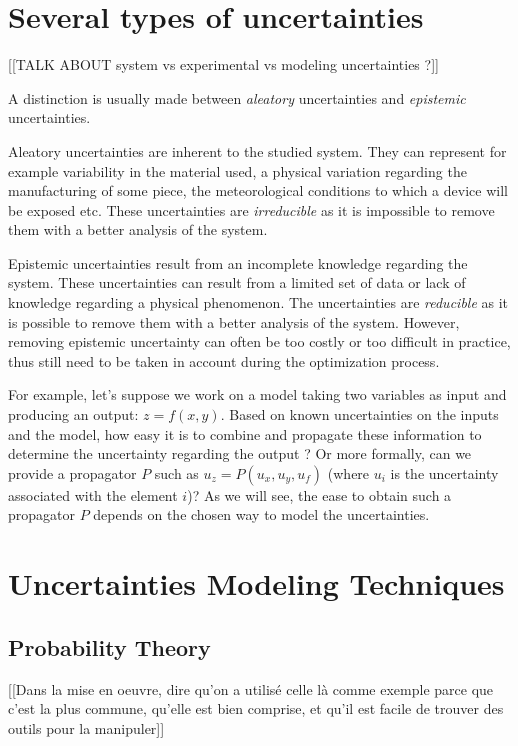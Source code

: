 \section{Several types of uncertainties}

[[TALK ABOUT system vs experimental vs modeling uncertainties ?]]

A distinction is usually made between \emph{aleatory} uncertainties and \emph{epistemic} uncertainties.

Aleatory uncertainties are inherent to the studied system. They can represent for example variability in the material used, a physical variation regarding the manufacturing of some piece, the meteorological conditions to which a device will be exposed etc.
These uncertainties are \emph{irreducible} as it is impossible to remove them with a better analysis of the system.

Epistemic uncertainties result from an incomplete knowledge regarding the system. These uncertainties can result from a limited set of data or lack of knowledge regarding a physical phenomenon.
The uncertainties are \emph{reducible} as it is possible to remove them with a better analysis of the system. However, removing epistemic uncertainty can often be too costly or too difficult in practice, thus still need to be taken in account during the optimization process.

For example, let's suppose we work on a model taking two variables as input and producing an output: $z=f(x,y)$.
Based on known uncertainties on the inputs and the model, how easy it is to combine and propagate these information to determine the uncertainty regarding the output ? Or more formally, can we provide a propagator $P$ such as $u_z = P(u_x, u_y, u_f)$ (where $u_i$ is the uncertainty associated with the element $i$)? As we will see, the ease to obtain such a propagator $P$ depends on the chosen way to model the uncertainties.

\section{Uncertainties Modeling Techniques}

\subsection{Probability Theory}

[[Dans la mise en oeuvre, dire qu'on a utilisé celle là comme exemple parce que c'est la plus commune, qu'elle est bien comprise, et qu'il est facile de trouver des outils pour la manipuler]]


